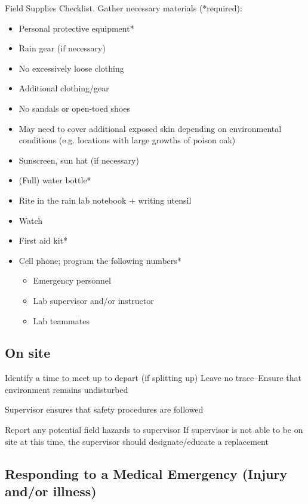 \documentclass[12pt]{../SOP3_beta}\usepackage[]{graphicx}\usepackage[]{color}
\begin{document}
\NP Field Supplies Checklist. Gather necessary materials (*required):

  \begin{itemize}
  \item Personal protective equipment*
  \item Rain gear (if necessary)
  \item No excessively loose clothing  
  \item Additional clothing/gear
  \item No sandals or open-toed shoes
  \item May need to cover additional exposed skin depending on environmental conditions (e.g. locations with large growths of poison oak)
  \item Sunscreen, sun hat (if necessary)
  
  \item (Full) water bottle*
  \item Rite in the rain lab notebook + writing utensil
  \item Watch
  \item First aid kit*
  \item Cell phone; program the following numbers*
\begin{itemize}
  \item Emergency personnel
  \item Lab supervisor and/or instructor
  \item Lab teammates
\end{itemize}
\end{itemize}

\subsection{On site}

\NP Identify a time to meet up to depart (if splitting up)
\NP Leave no trace--Ensure that environment remains undisturbed

\NP Supervisor ensures that safety procedures are followed

\NP Report any potential field hazards to supervisor
If supervisor is not able to be on site at this time, the supervisor should designate/educate a replacement

\subsection{Responding to a Medical Emergency (Injury and/or illness)}
\end{document}
